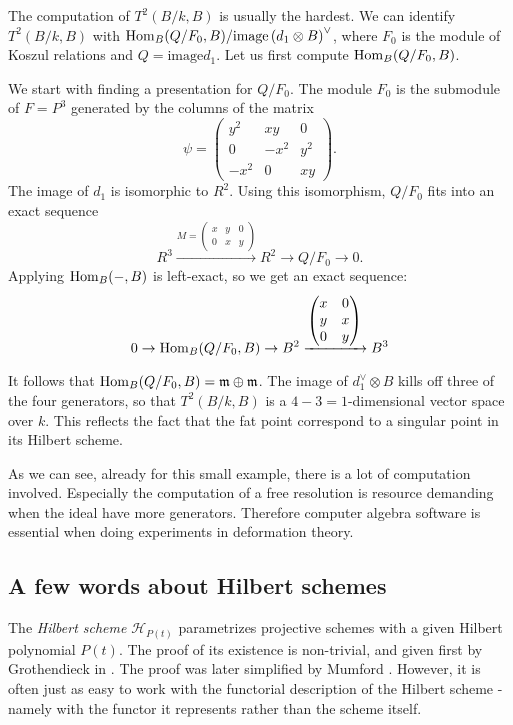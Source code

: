 \begin{example}
The computation of $T^2(B/k,B)$ is usually the hardest. We can identify $T^2(B/k,B)$ with $\operatorname{Hom}_B(Q/F_0,B)/\mathrm{image} \left(d_1 \otimes B\right)^{\vee}$, where $F_0$ is the module of Koszul relations and $Q= \mathrm{image} d_1$. Let us first compute $\operatorname{Hom}_B(Q/F_0,B)$. 

We start with finding a presentation for $Q/F_0$. The module $F_0$ is the submodule of $F=P^3$ generated by the columns of the matrix
\[
\psi = \begin{pmatrix}
y^2 & xy & 0 \\
0 & -x^2 & y^2 \\
-x^2 & 0 & xy
\end{pmatrix}.
\]
The image of $d_1$ is isomorphic to $R^2$. Using this isomorphism, $Q/F_0$ fits into an exact sequence
\[
R^3 \xrightarrow{
	M = \begin{pmatrix}
	x & y & 0 \\ 0 & x & y
	\end{pmatrix}
} R^2 \to Q/F_0 \to 0.
\]
Applying $\operatorname{Hom}_B(-,B)$ is left-exact, so we get an exact sequence:
\[
0 \to \operatorname{Hom}_B(Q/F_0,B) \to B^2 \xrightarrow{
	\begin{pmatrix}
	x & 0 \\ y & x \\ 0 & y
	\end{pmatrix}
} B^3
\]

It follows that $\operatorname{Hom}_B(Q/F_0,B)= \mathfrak m \oplus \mathfrak m$.  The image of $d_1^\vee \otimes B$ kills off three of the four generators, so that $T^2(B/k,B)$ is a $4-3=1$-dimensional vector space over $k$. This reflects the fact that the fat point correspond to a singular point in its Hilbert scheme.

As we can see, already for this small example, there is a lot of computation involved. Especially the computation of a free resolution is resource demanding when the ideal have more generators. Therefore computer algebra software is essential when doing experiments in deformation theory.
\end{example}

\subsection{A few words about Hilbert schemes}

The \emph{Hilbert scheme} $\mathscr H_{P(t)}$ parametrizes projective schemes with a given Hilbert polynomial $P(t)$. The proof of its existence is non-trivial, and given first by Grothendieck in \cite{MR1611822}. The proof was later simplified by Mumford \cite{MR0209285}. However, it is often just as easy to work with the functorial description of the Hilbert scheme - namely with the functor it represents rather than the scheme itself.

